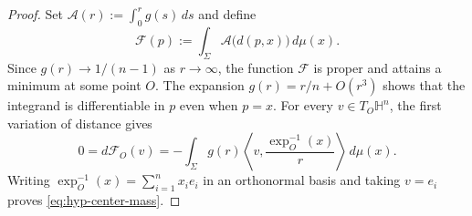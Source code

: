 \documentclass[11pt,reqno]{amsart}
\numberwithin{equation}{section}
\theoremstyle{definition}
\newcommand{\HH}{\mathbb H}
\begin{document}
\begin{proof}
Set $\mathcal A(r):=\int_0^r g(s)\,ds$ and define
\begin{equation*}
    \mathcal F(p):=\int_\Sigma\mathcal A\bigl(d(p,x)\bigr)\,d\mu(x).
\end{equation*}
Since $g(r)\to1/(n-1)$ as $r\to\infty$, the function $\mathcal F$ is proper and attains a minimum at some point $O$.  The expansion $g(r)=r/n+O(r^3)$ shows that the integrand is differentiable in $p$ even when $p=x$.  For every $v\in T_O\HH^n$, the first variation of distance gives
\begin{equation*}
    0=d\mathcal F_O(v)
    =-\int_\Sigma g(r)
      \left\langle v,\frac{\exp_O^{-1}(x)}{r}\right\rangle\,d\mu(x).
\end{equation*}
Writing $\exp_O^{-1}(x)=\sum_{i=1}^n x_i e_i$ in an orthonormal basis and taking $v=e_i$ proves \eqref{eq:hyp-center-mass}.
\end{proof}
\end{document}
